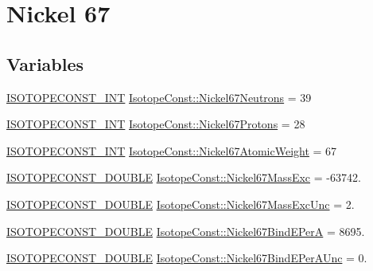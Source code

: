 \hypertarget{group___isotope_const-_nickel-_ni67}{}\section{Nickel 67}
\label{group___isotope_const-_nickel-_ni67}
\subsection*{Variables}
\begin{DoxyCompactItemize}
\item 
\mbox{\hyperlink{group___isotope_const-_macros_ga5f18360b3e99483a35c32d789e62621c}{I\+S\+O\+T\+O\+P\+E\+C\+O\+N\+S\+T\+\_\+\+I\+NT}} \mbox{\hyperlink{group___isotope_const-_nickel-_ni67_ga4e6407c3f669f8500119f057b1890198}{Isotope\+Const\+::\+Nickel67\+Neutrons}} = 39
\item 
\mbox{\hyperlink{group___isotope_const-_macros_ga5f18360b3e99483a35c32d789e62621c}{I\+S\+O\+T\+O\+P\+E\+C\+O\+N\+S\+T\+\_\+\+I\+NT}} \mbox{\hyperlink{group___isotope_const-_nickel-_ni67_ga0394c58b45fc60757390c5d16478e39b}{Isotope\+Const\+::\+Nickel67\+Protons}} = 28
\item 
\mbox{\hyperlink{group___isotope_const-_macros_ga5f18360b3e99483a35c32d789e62621c}{I\+S\+O\+T\+O\+P\+E\+C\+O\+N\+S\+T\+\_\+\+I\+NT}} \mbox{\hyperlink{group___isotope_const-_nickel-_ni67_ga182aacd9720bd5ce68664a28af489122}{Isotope\+Const\+::\+Nickel67\+Atomic\+Weight}} = 67
\item 
\mbox{\hyperlink{group___isotope_const-_macros_ga8f45a7272ce02c0b4c65c44636ed719a}{I\+S\+O\+T\+O\+P\+E\+C\+O\+N\+S\+T\+\_\+\+D\+O\+U\+B\+LE}} \mbox{\hyperlink{group___isotope_const-_nickel-_ni67_ga4c35df86f0472f077356f4a79d70d26e}{Isotope\+Const\+::\+Nickel67\+Mass\+Exc}} = -\/63742.
\item 
\mbox{\hyperlink{group___isotope_const-_macros_ga8f45a7272ce02c0b4c65c44636ed719a}{I\+S\+O\+T\+O\+P\+E\+C\+O\+N\+S\+T\+\_\+\+D\+O\+U\+B\+LE}} \mbox{\hyperlink{group___isotope_const-_nickel-_ni67_ga6f2f22dd171391f66f507b862876aa19}{Isotope\+Const\+::\+Nickel67\+Mass\+Exc\+Unc}} = 2.
\item 
\mbox{\hyperlink{group___isotope_const-_macros_ga8f45a7272ce02c0b4c65c44636ed719a}{I\+S\+O\+T\+O\+P\+E\+C\+O\+N\+S\+T\+\_\+\+D\+O\+U\+B\+LE}} \mbox{\hyperlink{group___isotope_const-_nickel-_ni67_ga6c47149ff0e6de0933c3bd998be855c5}{Isotope\+Const\+::\+Nickel67\+Bind\+E\+PerA}} = 8695.
\item 
\mbox{\hyperlink{group___isotope_const-_macros_ga8f45a7272ce02c0b4c65c44636ed719a}{I\+S\+O\+T\+O\+P\+E\+C\+O\+N\+S\+T\+\_\+\+D\+O\+U\+B\+LE}} \mbox{\hyperlink{group___isotope_const-_nickel-_ni67_ga6df03ab16ea63a7ec52245cc269887ad}{Isotope\+Const\+::\+Nickel67\+Bind\+E\+Per\+A\+Unc}} = 0.

\end{DoxyCompactItemize}
